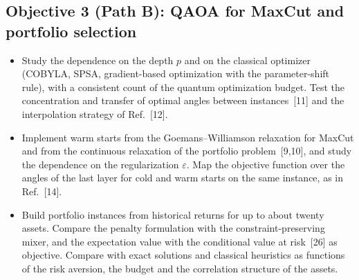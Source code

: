 \documentclass[12pt,a4paper]{article}
\begin{document}
\subsection*{Objective 3 (Path B): QAOA for MaxCut and portfolio selection}
\begin{itemize}
  \item Study the dependence on the depth $p$ and on the classical
  optimizer (COBYLA, SPSA, gradient-based optimization with the
  parameter-shift rule), with a consistent count of the quantum
  optimization budget.  Test the concentration and transfer of optimal
  angles between instances~[11] and the interpolation strategy of
  Ref.~[12].
  \item Implement warm starts from the Goemans--Williamson relaxation
  for MaxCut and from the continuous relaxation of the portfolio
  problem~[9,10], and study the dependence on the regularization
  $\varepsilon$.  Map the objective function over the angles of the
  last layer for cold and warm starts on the same instance, as in
  Ref.~[14].
  \item Build portfolio instances from historical returns for up to
  about twenty assets.  Compare the penalty formulation with the
  constraint-preserving mixer, and the expectation value with the
  conditional value at risk~[26] as objective.  Compare with exact
  solutions and classical heuristics as functions of the risk
  aversion, the budget and the correlation structure of the assets.
\end{itemize}
\end{document}

